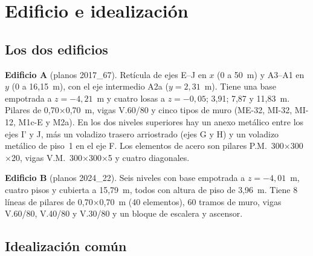 \documentclass[11pt,a4paper]{article}
\begin{document}
\section{Edificio e idealización}

\subsection{Los dos edificios}

\textbf{Edificio A} (planos 2017\_67). Retícula de ejes E--J en $x$ (0 a 50~m)
y A3--A1 en $y$ (0 a 16,15~m), con el eje intermedio A2a ($y = 2{,}31$~m).
Tiene una base empotrada a $z = -4{,}21$~m y cuatro losas a $z = -0{,}05$;
3,91; 7,87 y 11,83~m. Pilares de 0,70$\times$0,70~m, vigas V.60/80 y cinco tipos
de muro (ME-32, MI-32, MI-12, M1c-E y M2a). En los dos niveles superiores hay un
anexo metálico entre los ejes I' y J, más un voladizo trasero arriostrado
(ejes G y H) y un voladizo metálico de piso~1 en el eje F. Los elementos de acero
son pilares P.M.~300$\times$300$\times$20, vigas V.M.~300$\times$300$\times$5 y
cuatro diagonales.

\textbf{Edificio B} (planos 2024\_22). Seis niveles con base empotrada a
$z = -4{,}01$~m, cuatro pisos y cubierta a 15,79~m, todos con altura de piso de
3,96~m. Tiene 8 líneas de pilares de 0,70$\times$0,70~m (40 elementos), 60
tramos de muro, vigas V.60/80, V.40/80 y V.30/80 y un bloque de escalera y
ascensor.

\subsection{Idealización común}
\end{document}

